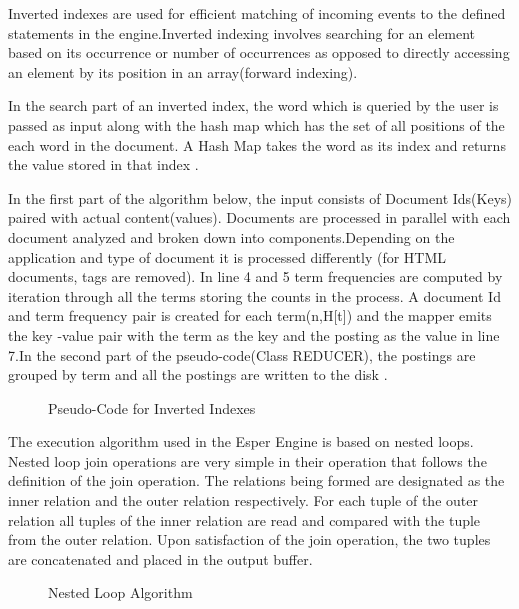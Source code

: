 \noindent Inverted indexes are used for efficient matching of incoming events to the defined statements in the engine.Inverted indexing involves searching for an element based on its occurrence or number  of occurrences as opposed to directly accessing an element by its position in an array(forward indexing).

\noindent In the search part of an inverted index, the word which is queried by the user is passed as input along with the hash map which has the set of all positions of the each word in the document. A Hash Map takes the word as its index and returns the value stored in that index \cite{twentyeight}.

\noindent In the first part of the algorithm below, the input consists of Document Ids(Keys) paired with actual content(values). Documents are processed in parallel with each document analyzed and broken down into components.Depending on the application and type of document it is processed differently (for HTML documents, tags are removed). In line 4 and 5 term frequencies are computed by iteration through all the terms storing the counts in the process. A document Id and term frequency pair is created for each term(n,H[t]) and the mapper emits the key -value pair with the term as the key and the posting as the value in line 7.In the second part of the pseudo-code(Class REDUCER), the postings are grouped by term and all the postings are written to the disk \cite{thirtytwo}.


\begin{center}
\begin{figure}[h]
\caption{Pseudo-Code for Inverted Indexes \cite{thirtytwo}}

\end{figure}
\end{center}

\noindent The execution algorithm used in the Esper Engine is based on nested loops. Nested loop join operations are very simple in their operation that follows the definition of the join operation. The relations being formed are designated as the inner relation and the outer relation respectively. For each tuple of the outer relation all tuples  of the inner relation are read and compared with the tuple from the outer relation. Upon satisfaction of the join operation, the two tuples are concatenated and placed in the output buffer.
\newpage

\begin{center}
\begin{figure}[h]
\caption{Nested Loop Algorithm\cite{twentynine}}

\end{figure}
\end{center}

